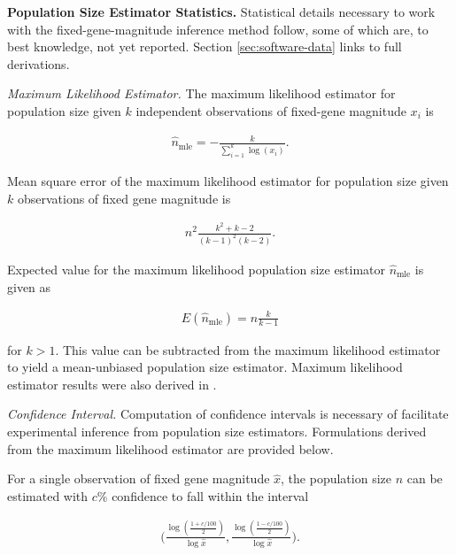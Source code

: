 \textbf{Population Size Estimator Statistics.}
Statistical details necessary to work with the fixed-gene-magnitude inference method follow, some of which are, to best knowledge, not yet reported.
Section \ref{sec:software-data} links to full derivations.

\textit{Maximum Likelihood Estimator.}
The maximum likelihood estimator for population size given $k$ independent observations of fixed-gene magnitude $x_i$ is
\begin{footnotesize}
\begin{align} \label{eqn:popsize_mle}
\hat{n}_\mathrm{mle} = -\frac{k}{\sum_{i=1}^k \log( x_i )}.
\end{align}
\end{footnotesize}

Mean square error of the maximum likelihood estimator for population size given $k$ observations of fixed gene magnitude is

\begin{footnotesize}
\begin{align*}
n^2 \frac{k^{2}+ k-2}{(k-1)^{2}(k-2)}.
\end{align*}
\end{footnotesize}

Expected value for the maximum likelihood population size estimator $\hat{n}_\mathrm{mle}$ is given as

\begin{footnotesize}
\begin{align*}
E(\hat{n}_\mathrm{mle})
= n\frac{k}{k-1}
\end{align*}
\end{footnotesize}

for $k>1$.
This value can be subtracted from the maximum likelihood estimator to yield a mean-unbiased population size estimator.
Maximum likelihood estimator results were also derived in \citep{varagnolo2010distributed}.

\textit{Confidence Interval.}
Computation of confidence intervals is necessary of facilitate experimental inference from population size estimators.
Formulations derived from the maximum likelihood estimator are provided below.

For a single observation of fixed gene magnitude $\hat{x}$, the population size $n$ can be estimated with $c\%$ confidence to fall within the interval

\begin{footnotesize}
\begin{align*}
\Big(
\frac{\log(\frac{1+c/100}{2})}{\log\hat{x}},
\frac{\log(\frac{1-c/100}{2})}{\log\hat{x}}
\Big).
\end{align*}
\end{footnotesize}

